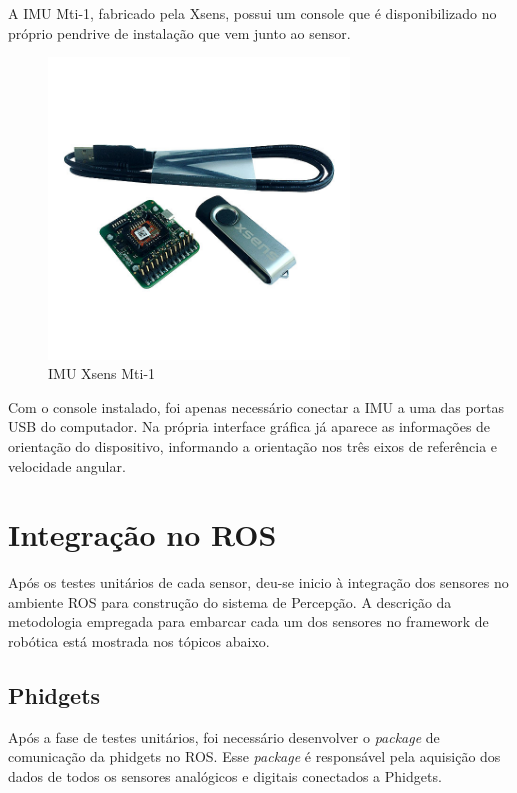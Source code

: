 	    A IMU Mti-1, fabricado pela Xsens, possui um console que é disponibilizado no próprio pendrive de instalação que vem junto ao sensor.
	    
	    \begin{figure}[!ht]
		   \centering
		   \includegraphics[width=8cm]{Figures/imu.jpg}
		   \caption{IMU Xsens Mti-1}
		   \label{fig:IMU}
		\end{figure}
	    
	     Com o console instalado, foi apenas necessário conectar a IMU a uma das portas USB do computador. Na própria interface gráfica já aparece as informações de orientação do dispositivo, informando a orientação nos três eixos de referência e velocidade angular.
	
\section{Integração no ROS}
\label{sec:rosinte}

	Após os testes unitários de cada sensor, deu-se inicio à integração dos sensores no ambiente ROS para construção do sistema de Percepção. A descrição da metodologia empregada para embarcar cada um dos sensores no framework de robótica está mostrada nos tópicos abaixo.

\subsection{Phidgets}
     Após a fase de testes unitários, foi necessário desenvolver o \textit{package} de comunicação da phidgets no ROS. Esse \textit{package} é responsável pela aquisição dos dados de todos os sensores analógicos e digitais conectados a Phidgets.
     
